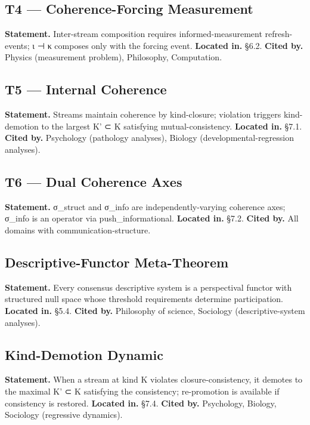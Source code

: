 \documentclass[11pt, openany]{book}
\newcommand{\sectionbreak}{\clearpage}
\begin{document}
\subsection{T4 --- Coherence-Forcing Measurement}
\textbf{Statement.} Inter-stream composition requires informed-measurement refresh-events; ι ⊣ κ composes only with the forcing event.
\textbf{Located in.} §6.2.
\textbf{Cited by.} Physics (measurement problem), Philosophy, Computation.

\subsection{T5 --- Internal Coherence}
\textbf{Statement.} Streams maintain coherence by kind-closure; violation triggers kind-demotion to the largest K' ⊂ K satisfying mutual-consistency.
\textbf{Located in.} §7.1.
\textbf{Cited by.} Psychology (pathology analyses), Biology (developmental-regression analyses).

\subsection{T6 --- Dual Coherence Axes}
\textbf{Statement.} σ\_\allowbreak{}struct and σ\_\allowbreak{}info are independently-varying coherence axes; σ\_\allowbreak{}info is an operator via push\_\allowbreak{}informational.
\textbf{Located in.} §7.2.
\textbf{Cited by.} All domains with communication-structure.

\subsection{Descriptive-Functor Meta-Theorem}
\textbf{Statement.} Every consensus descriptive system is a perspectival functor with structured null space whose threshold requirements determine participation.
\textbf{Located in.} §5.4.
\textbf{Cited by.} Philosophy of science, Sociology (descriptive-system analyses).

\subsection{Kind-Demotion Dynamic}
\textbf{Statement.} When a stream at kind K violates closure-consistency, it demotes to the maximal K' ⊂ K satisfying the consistency; re-promotion is available if consistency is restored.
\textbf{Located in.} §7.4.
\textbf{Cited by.} Psychology, Biology, Sociology (regressive dynamics).

\sectionbreak
\end{document}
